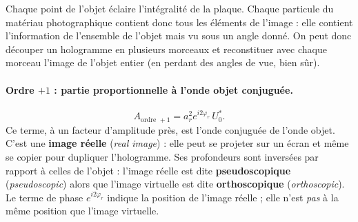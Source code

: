 \begin{remark}
  Chaque point de l'objet éclaire l'intégralité de la plaque. Chaque particule
  du matériau photographique contient donc tous les éléments de l'image : elle
  contient l'information de l'ensemble de l'objet mais vu sous un angle donné.
  On peut donc découper un hologramme en plusieurs morceaux et reconstituer avec
  chaque morceau l'image de l'objet entier (en perdant des angles de vue, bien
  sûr).
\end{remark}

\paragraph{Ordre $+1$ : partie proportionnelle à l'onde objet conjuguée.}
\begin{equation*}
  A_{\text{ordre }+1} = a_r^2 e^{i2\varphi_r}\,U_0^{*}.
\end{equation*}
Ce terme, à un facteur d'amplitude près, est l'onde conjuguée de l'onde objet.
C'est une \textbf{image réelle} (\textit{real image}) : elle peut se projeter sur
un écran et même se copier pour dupliquer l'hologramme. Ses profondeurs sont
inversées par rapport à celles de l'objet : l'image réelle est dite
\textbf{pseudoscopique} (\textit{pseudoscopic}) alors que l'image virtuelle est
dite \textbf{orthoscopique} (\textit{orthoscopic}). Le terme de phase
$e^{i2\varphi_r}$ indique la position de l'image réelle ; elle n'est \emph{pas} à
la même position que l'image virtuelle.

\begin{figure}[h!]
  \centering
\end{figure}

